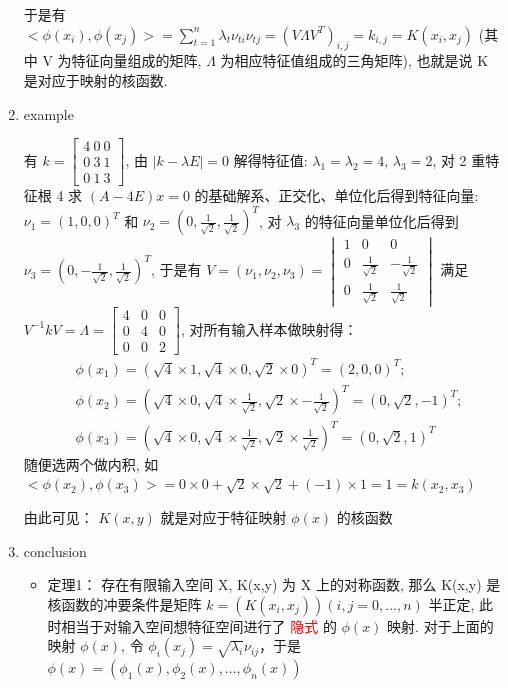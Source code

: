 \documentclass[oneside, 12pt]{ctexbook}
\begin{document}
\begin{enumerate}
						于是有 $<\phi(x_i), \phi(x_j)> = \sum_{t=1}^{n} \lambda_t \nu_{ti} \nu_{tj} = (V \Lambda V^T)_{i,j} = k_{i,j} = K(x_i, x_j)$ (其中 V 为特征向量组成的矩阵, $\Lambda$ 为相应特征值组成的三角矩阵), 也就是说 K 是对应于映射的核函数.
						
					\item example
						
						有 $k = \left[ \begin{matrix}
						4 \ 0 \ 0 \\ 0 \ 3 \ 1 \\ 0 \ 1 \ 3
						\end{matrix} \right]$, 由
						$|k - \lambda E| = 0$ 解得特征值: $\lambda_1 = \lambda_2 = 4$, $\lambda_3 = 2$, 对 2 重特征根 4 求  $(A-4E)x = 0$ 的基础解系、正交化、单位化后得到特征向量: $\nu_1 = (1,0,0)^T$ 和 $\nu_2 = (0, \frac{1}{\sqrt{2}}, \frac{1}{\sqrt{2}})^T$, 对 $\lambda_3$ 的特征向量单位化后得到 $\nu_3 = (0, -\frac{1}{\sqrt{2}}, \frac{1}{\sqrt{2}})^T$, 于是有
							$V = (\nu_1, \nu_2, \nu_3) = \begin{vmatrix}
								1 & 0 & 0\\
								0 & \frac{1}{\sqrt{2}} & -\frac{1}{\sqrt{2}}\\
								0 & \frac{1}{\sqrt{2}} & \frac{1}{\sqrt{2}}
							\end{vmatrix}$
						满足$V^{-1} k V = \Lambda = \begin{bmatrix}
								4 & 0 & 0\\
								0 & 4 & 0\\
								0 & 0 & 2
						\end{bmatrix}$, 对所有输入样本做映射得：
						\begin{align}
							&\phi(x_1) = (\sqrt{4}\times 1, \sqrt{4} \times 0, \sqrt{2} \times 0)^T = (2,0,0)^T;\\
							&\phi(x_2) = (\sqrt{4}\times 0, \sqrt{4} \times \frac{1}{\sqrt{2}}, \sqrt{2} \times -\frac{1}{\sqrt{2}})^T = (0,\sqrt{2},-1)^T;\\
							&\phi(x_3) = (\sqrt{4}\times 0, \sqrt{4} \times \frac{1}{\sqrt{2}}, \sqrt{2} \times \frac{1}{\sqrt{2}})^T = (0,\sqrt{2},1)^T
						\end{align}
						随便选两个做内积, 如 $<\phi(x_2), \phi(x_3)> = 0 \times 0 + \sqrt{2} \times \sqrt{2} + (-1)\times 1 = 1 = k(x_2, x_3)$
						
						由此可见： $K(x,y)$ 就是对应于特征映射 $\phi(x)$ 的核函数 
						
					\item conclusion
						\begin{itemize}
							\item 定理1： 存在有限输入空间 X, K(x,y) 为 X 上的对称函数, 那么 K(x,y) 是核函数的冲要条件是矩阵 $k = (K(x_i, x_j)) (i,j=0,...,n)$ 半正定, 此时相当于对输入空间想特征空间进行了 \textcolor{red}{隐式} 的 $\phi(x)$ 映射. 对于上面的映射 $\phi(x)$, 令 $\phi_i(x_j) = \sqrt{\lambda_i} \nu_{ij}$，于是 $\phi(x) = (\phi_1(x), \phi_2(x), ..., \phi_n(x))$
							

\end{itemize}
\end{enumerate}
\end{document}
